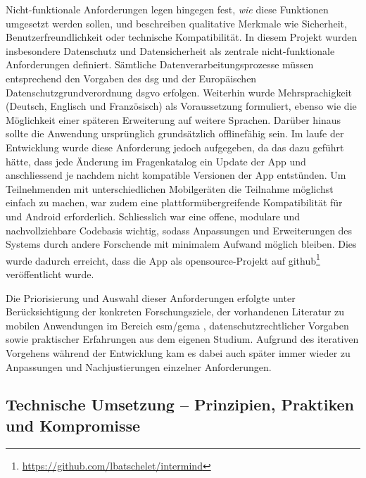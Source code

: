 Nicht-funktionale Anforderungen legen hingegen fest, \textit{wie} diese Funktionen umgesetzt werden sollen, und beschreiben qualitative Merkmale wie Sicherheit, Benutzerfreundlichkeit oder technische Kompatibilität. In diesem Projekt wurden insbesondere Datenschutz und Datensicherheit als zentrale nicht-funktionale Anforderungen definiert. Sämtliche Datenverarbeitungsprozesse müssen entsprechend den Vorgaben des \acrfull{dsg} und der Europäischen Datenschutzgrundverordnung \acrshort{dsgvo} erfolgen. Weiterhin wurde Mehrsprachigkeit (Deutsch, Englisch und Französisch) als Voraussetzung formuliert, ebenso wie die Möglichkeit einer späteren Erweiterung auf weitere Sprachen. Darüber hinaus sollte die Anwendung ursprünglich grundsätzlich offlinefähig sein. Im laufe der Entwicklung wurde diese Anforderung jedoch aufgegeben, da das dazu geführt hätte, dass jede Änderung im Fragenkatalog ein Update der App und anschliessend je nachdem nicht kompatible Versionen der App entstünden. Um Teilnehmenden mit unterschiedlichen Mobilgeräten die Teilnahme möglichst einfach zu machen, war zudem eine plattformübergreifende Kompatibilität für  und Android erforderlich. Schliesslich war eine offene, modulare und nachvollziehbare Codebasis wichtig, sodass Anpassungen und Erweiterungen des Systems durch andere Forschende mit minimalem Aufwand möglich bleiben. Dies wurde dadurch erreicht, dass die App als \gls{opensource}-Projekt auf \gls{github}\footnote{\href{https://github.com/lbatschelet/intermind}{https://github.com/lbatschelet/intermind}} veröffentlicht wurde.

Die Priorisierung und Auswahl dieser Anforderungen erfolgte unter Berücksichtigung der konkreten Forschungsziele, der vorhandenen Literatur zu mobilen Anwendungen im Bereich \gls{esm}/\gls{gema} \parencite[u.a.][]{chenPerceivedUrbanEnvironment2025, bakolisUrbanMindUsing2018, randallDevelopmentTrialMobile2013}, datenschutzrechtlicher Vorgaben sowie praktischer Erfahrungen aus dem eigenen Studium. Aufgrund des iterativen Vorgehens während der Entwicklung kam es dabei auch später immer wieder zu Anpassungen und Nachjustierungen einzelner Anforderungen.

\subsection{Technische Umsetzung – Prinzipien, Praktiken und Kompromisse}


